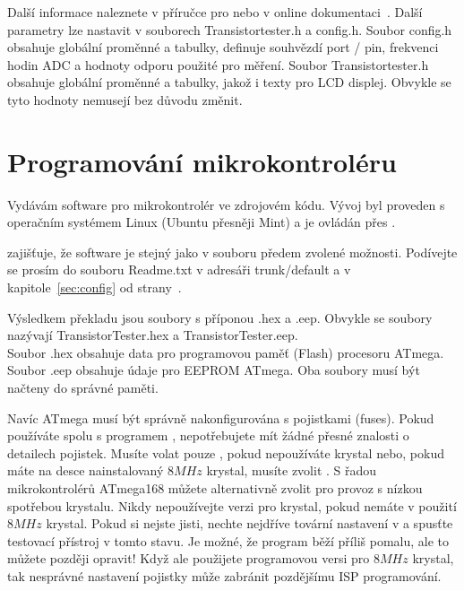 Další informace naleznete v příručce pro  nebo v online dokumentaci~\cite{avrdude}.
Další parametry lze nastavit v souborech Transistortester.h a config.h.
Soubor config.h obsahuje globální proměnné a tabulky, definuje souhvězdí port / pin,
frekvenci hodin ADC a hodnoty odporu použité pro měření.
Soubor Transistortester.h obsahuje globální proměnné a tabulky, jakož i texty pro LCD displej.
Obvykle se tyto hodnoty nemusejí bez důvodu změnit.
\section{Programování mikrokontroléru}
Vydávám software pro mikrokontrolér ve zdrojovém kódu.
Vývoj byl proveden s operačním systémem Linux (Ubuntu přesněji Mint) a je ovládán přes .

 zajišťuje, že software je stejný jako v souboru  předem zvolené možnosti.
Podívejte se prosím do souboru Readme.txt
v adresáři trunk/default a v kapitole~\ref{sec:config} od strany~\pageref{sec:config}.

Výsledkem překladu jsou soubory s příponou .hex a .eep.
Obvykle se soubory nazývají TransistorTester.hex a TransistorTester.eep.\\
Soubor .hex obsahuje data pro programovou paměť (Flash) procesoru ATmega.
Soubor .eep obsahuje údaje pro EEPROM ATmega.
Oba soubory musí být načteny do správné paměti.

Navíc ATmega musí být správně nakonfigurována s pojistkami (fuses).
Pokud používáte  spolu s programem  \cite{avrdude}, nepotřebujete mít
žádné přesné znalosti o detailech pojistek.
Musíte volat pouze , pokud nepoužíváte krystal nebo,
pokud máte na desce nainstalovaný  \(8MHz\) krystal, musíte zvolit .
S řadou mikrokontrolérů ATmega168 můžete alternativně zvolit  pro
provoz s nízkou spotřebou krystalu.
Nikdy nepoužívejte verzi pro krystal, pokud nemáte v použití \(8MHz\) krystal.
Pokud si nejste jisti, nechte nejdříve tovární nastavení v  a spusťte testovací přístroj v tomto stavu.
Je možné, že program běží příliš pomalu, ale to můžete později opravit!
Když ale použijete programovou versi pro \(8MHz\) krystal, 
tak nesprávné nastavení pojistky může zabránit pozdějšímu ISP programování.

